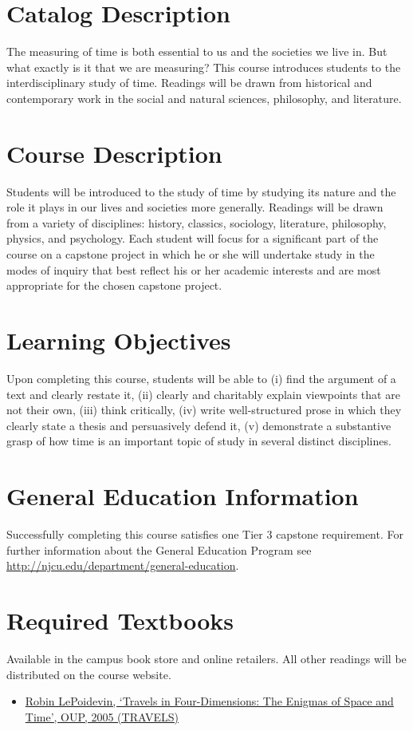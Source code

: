 \documentclass[article,oneside]{memoir}
\begin{document}
\section{Catalog Description}
The measuring of time is both essential to us and the societies we live in. But what exactly is it that we are measuring? This course introduces students to the interdisciplinary study of time. Readings will be drawn from historical and contemporary work in the social and natural sciences, philosophy, and literature.

\section{Course Description}
Students will be introduced to the study of time by studying its nature and the role it plays in our lives and societies more generally. Readings will be drawn from a variety of disciplines: history, classics, sociology, literature, philosophy, physics, and psychology. Each student will focus for a significant part of the course on a capstone project in which he or she will undertake study in the modes of inquiry that best reflect his or her academic interests and are most appropriate for the chosen capstone project. 





\section{Learning Objectives}

Upon completing this course, students will be able to (i) find the argument of a text and clearly restate it, (ii) clearly and charitably explain viewpoints that are not their own, (iii) think critically, (iv) write well-structured prose in which they clearly state a thesis and persuasively defend it, (v) demonstrate a substantive grasp of how time is an  important topic of study in several distinct disciplines. 

\section{General Education Information} 
Successfully completing this course satisfies one Tier 3 capstone requirement. For further information about the General Education Program see \href{http://njcu.edu/department/general-education}{http://njcu.edu/department/general-education}.

\section{Required Textbooks}
Available in the campus book store and online retailers. All other readings will be distributed on the course website. 
\begin{itemize}
\item \href{http://www.amazon.com/Travels-Four-Dimensions-Enigmas-Space/dp/0198752555/ref=sr_1_1?ie=UTF8&qid=1452098846&sr=8-1&keywords=robin+le+poidevin+enigmas}{Robin LePoidevin, `Travels in Four-Dimensions: The Enigmas of Space and Time', OUP, 2005 (TRAVELS)}
\end{itemize}
\end{document}
